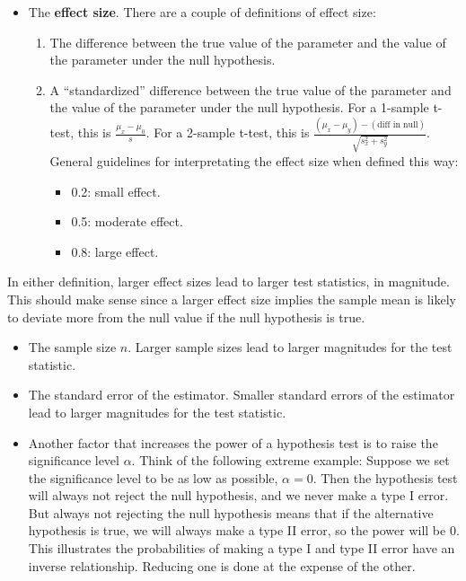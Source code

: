 \documentclass[
]{book}
\providecommand{\tightlist}{%
  \setlength{\itemsep}{0pt}\setlength{\parskip}{0pt}}
\theoremstyle{definition}
\theoremstyle{definition}
\theoremstyle{definition}
\theoremstyle{definition}
\theoremstyle{remark}
\begin{document}
\begin{itemize}
\item
  The \textbf{effect size}. There are a couple of definitions of effect size:

  \begin{enumerate}
  \def\labelenumi{\arabic{enumi}.}
  \tightlist
  \item
    The difference between the true value of the parameter and the value of the parameter under the null hypothesis.
  \item
    A ``standardized'' difference between the true value of the parameter and the value of the parameter under the null hypothesis. For a 1-sample t-test, this is \(\frac{\mu_x - \mu_0}{s}\). For a 2-sample t-test, this is \(\frac{(\mu_x - \mu_y) - (\text{diff in null})}{\sqrt{s_x^2 + s_y^2}}\). General guidelines for interpretating the effect size when defined this way:

    \begin{itemize}
    \tightlist
    \item
      0.2: small effect.
    \item
      0.5: moderate effect.
    \item
      0.8: large effect.
    \end{itemize}
  \end{enumerate}
\end{itemize}

In either definition, larger effect sizes lead to larger test statistics, in magnitude. This should make sense since a larger effect size implies the sample mean is likely to deviate more from the null value if the null hypothesis is true.

\begin{itemize}
\item
  The sample size \(n\). Larger sample sizes lead to larger magnitudes for the test statistic.
\item
  The standard error of the estimator. Smaller standard errors of the estimator lead to larger magnitudes for the test statistic.
\item
  Another factor that increases the power of a hypothesis test is to raise the significance level \(\alpha\). Think of the following extreme example: Suppose we set the significance level to be as low as possible, \(\alpha=0\). Then the hypothesis test will always not reject the null hypothesis, and we never make a type I error. But always not rejecting the null hypothesis means that if the alternative hypothesis is true, we will always make a type II error, so the power will be 0. This illustrates the probabilities of making a type I and type II error have an inverse relationship. Reducing one is done at the expense of the other.
\end{itemize}
\end{document}
